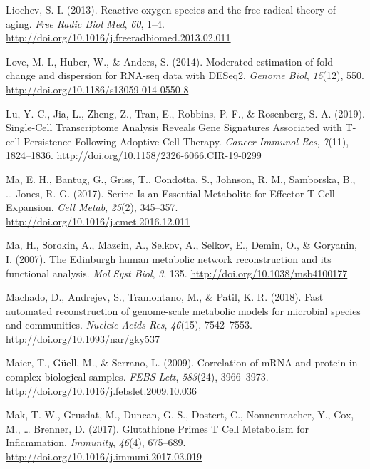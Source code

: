 \documentclass[12pt,twoside,openany,\mydriver]{thesis}  %
\begin{document}
\leavevmode\hypertarget{ref-liochev_reactive_2013}{}%
Liochev, S. I. (2013). Reactive oxygen species and the free radical theory of aging. \emph{Free Radic Biol Med}, \emph{60}, 1--4. \url{http://doi.org/10.1016/j.freeradbiomed.2013.02.011}

\leavevmode\hypertarget{ref-love_moderated_2014}{}%
Love, M. I., Huber, W., \& Anders, S. (2014). Moderated estimation of fold change and dispersion for RNA-seq data with DESeq2. \emph{Genome Biol}, \emph{15}(12), 550. \url{http://doi.org/10.1186/s13059-014-0550-8}

\leavevmode\hypertarget{ref-lu_single-cell_2019}{}%
Lu, Y.-C., Jia, L., Zheng, Z., Tran, E., Robbins, P. F., \& Rosenberg, S. A. (2019). Single-Cell Transcriptome Analysis Reveals Gene Signatures Associated with T-cell Persistence Following Adoptive Cell Therapy. \emph{Cancer Immunol Res}, \emph{7}(11), 1824--1836. \url{http://doi.org/10.1158/2326-6066.CIR-19-0299}

\leavevmode\hypertarget{ref-ma_serine_2017}{}%
Ma, E. H., Bantug, G., Griss, T., Condotta, S., Johnson, R. M., Samborska, B., \ldots{} Jones, R. G. (2017). Serine Is an Essential Metabolite for Effector T Cell Expansion. \emph{Cell Metab}, \emph{25}(2), 345--357. \url{http://doi.org/10.1016/j.cmet.2016.12.011}

\leavevmode\hypertarget{ref-ma_edinburgh_2007}{}%
Ma, H., Sorokin, A., Mazein, A., Selkov, A., Selkov, E., Demin, O., \& Goryanin, I. (2007). The Edinburgh human metabolic network reconstruction and its functional analysis. \emph{Mol Syst Biol}, \emph{3}, 135. \url{http://doi.org/10.1038/msb4100177}

\leavevmode\hypertarget{ref-machado_fast_2018}{}%
Machado, D., Andrejev, S., Tramontano, M., \& Patil, K. R. (2018). Fast automated reconstruction of genome-scale metabolic models for microbial species and communities. \emph{Nucleic Acids Res}, \emph{46}(15), 7542--7553. \url{http://doi.org/10.1093/nar/gky537}

\leavevmode\hypertarget{ref-maier_correlation_2009}{}%
Maier, T., Güell, M., \& Serrano, L. (2009). Correlation of mRNA and protein in complex biological samples. \emph{FEBS Lett}, \emph{583}(24), 3966--3973. \url{http://doi.org/10.1016/j.febslet.2009.10.036}

\leavevmode\hypertarget{ref-mak_glutathione_2017}{}%
Mak, T. W., Grusdat, M., Duncan, G. S., Dostert, C., Nonnenmacher, Y., Cox, M., \ldots{} Brenner, D. (2017). Glutathione Primes T Cell Metabolism for Inflammation. \emph{Immunity}, \emph{46}(4), 675--689. \url{http://doi.org/10.1016/j.immuni.2017.03.019}
\end{document}

